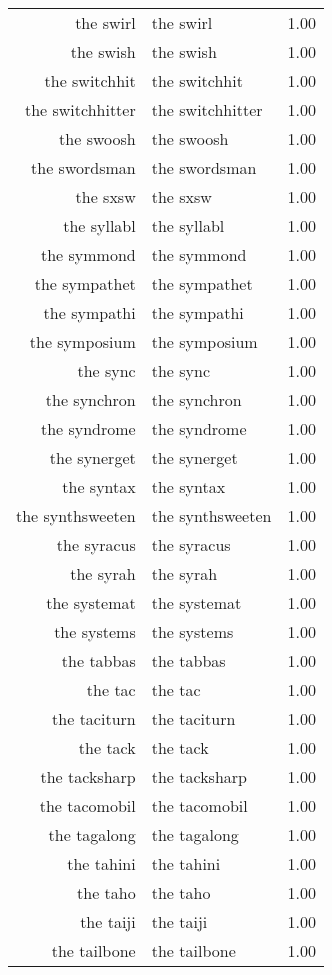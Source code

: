 \begin{table}[ht]
\begin{tabular}{rlr}
  the swirl & the swirl & 1.00 \\ 
  the swish & the swish & 1.00 \\ 
  the switchhit & the switchhit & 1.00 \\ 
  the switchhitter & the switchhitter & 1.00 \\ 
  the swoosh & the swoosh & 1.00 \\ 
  the swordsman & the swordsman & 1.00 \\ 
  the sxsw & the sxsw & 1.00 \\ 
  the syllabl & the syllabl & 1.00 \\ 
  the symmond & the symmond & 1.00 \\ 
  the sympathet & the sympathet & 1.00 \\ 
  the sympathi & the sympathi & 1.00 \\ 
  the symposium & the symposium & 1.00 \\ 
  the sync & the sync & 1.00 \\ 
  the synchron & the synchron & 1.00 \\ 
  the syndrome & the syndrome & 1.00 \\ 
  the synerget & the synerget & 1.00 \\ 
  the syntax & the syntax & 1.00 \\ 
  the synthsweeten & the synthsweeten & 1.00 \\ 
  the syracus & the syracus & 1.00 \\ 
  the syrah & the syrah & 1.00 \\ 
  the systemat & the systemat & 1.00 \\ 
  the systems & the systems & 1.00 \\ 
  the tabbas & the tabbas & 1.00 \\ 
  the tac & the tac & 1.00 \\ 
  the taciturn & the taciturn & 1.00 \\ 
  the tack & the tack & 1.00 \\ 
  the tacksharp & the tacksharp & 1.00 \\ 
  the tacomobil & the tacomobil & 1.00 \\ 
  the tagalong & the tagalong & 1.00 \\ 
  the tahini & the tahini & 1.00 \\ 
  the taho & the taho & 1.00 \\ 
  the taiji & the taiji & 1.00 \\ 
  the tailbone & the tailbone & 1.00 \\ 

\end{tabular}
\end{table}
